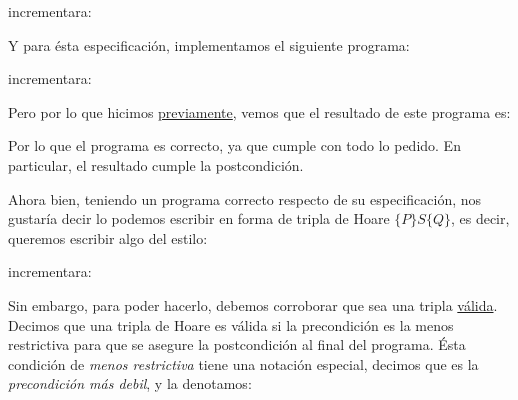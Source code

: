 \documentclass[../main.tex]{subfiles}
\begin{document}
\begin{proc}{incrementar}{\Inout a: \Z}{}
\end{proc}

\nln

Y para ésta especificación, implementamos el siguiente programa:


\begin{proc}{incrementar}{\Inout a: \Z}{}
           \par
      \par
         \par
\end{proc} \label{specification_example_1}

Pero por lo que hicimos \hyperref[correct_program_example]{previamente}, vemos que el resultado de este programa es:

\begin{center}
{\textcolor{blue}{}}
\end{center}

\nln

Por lo que el programa es correcto, ya que cumple con todo lo pedido. En particular, el resultado cumple la postcondición.

Ahora bien, teniendo un programa correcto respecto de su especificación, nos gustaría decir lo podemos escribir en forma de tripla de Hoare $\{P\}S\{Q\}$, es decir, queremos
escribir algo del estilo:

\begin{proc}{incrementar}{\Inout a: \Z}{}
           \par
      \par
         \par
\end{proc} \label{specification_example_1_triplet}

Sin embargo, para poder hacerlo, debemos corroborar que sea una tripla \ul{válida}. Decimos que una tripla de Hoare es válida si la precondición es la menos restrictiva para que se
asegure la postcondición al final del programa. Ésta condición de \textit{menos restrictiva} tiene una notación especial, decimos que es la \textit{precondición más debil}, y la denotamos:
\end{document}
